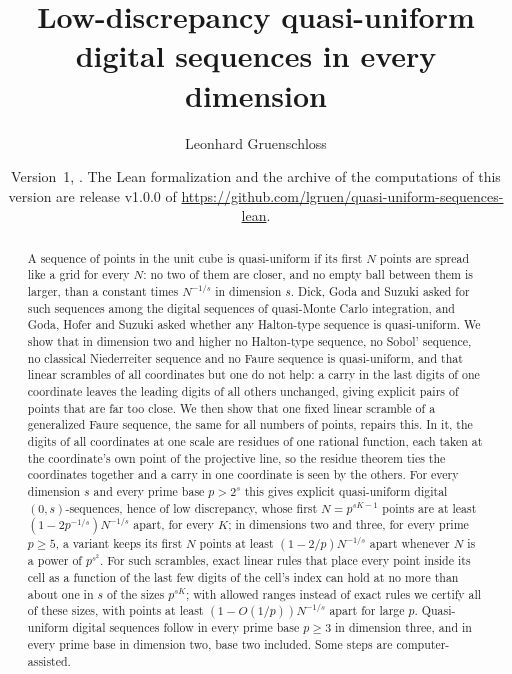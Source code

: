\documentclass[11pt]{amsart}
\title[Quasi-uniform digital sequences in every dimension]{Low-discrepancy quasi-uniform digital sequences in every dimension}
\author{Leonhard Gruenschloss}
\date{Version~1, \VersionDate. The Lean formalization and the archive of the computations of this version are release v1.0.0 of \url{https://github.com/lgruen/quasi-uniform-sequences-lean}.}
\theoremstyle{definition}
\theoremstyle{plain}
\begin{document}
\begin{abstract}
A sequence of points in the unit cube is quasi-uniform if its first $N$ points are spread like a grid for every $N$: no two of them are closer, and no empty ball between them is larger, than a constant times $N^{-1/s}$ in dimension $s$. Dick, Goda and Suzuki asked for such sequences among the digital sequences of quasi-Monte Carlo integration, and Goda, Hofer and Suzuki asked whether any Halton-type sequence is quasi-uniform. We show that in dimension two and higher no Halton-type sequence, no Sobol' sequence, no classical Niederreiter sequence and no Faure sequence is quasi-uniform, and that linear scrambles of all coordinates but one do not help: a carry in the last digits of one coordinate leaves the leading digits of all others unchanged, giving explicit pairs of points that are far too close. We then show that one fixed linear scramble of a generalized Faure sequence, the same for all numbers of points, repairs this. In it, the digits of all coordinates at one scale are residues of one rational function, each taken at the coordinate's own point of the projective line, so the residue theorem ties the coordinates together and a carry in one coordinate is seen by the others. For every dimension $s$ and every prime base $p>2^s$ this gives explicit quasi-uniform digital $(0,s)$-sequences, hence of low discrepancy, whose first $N=p^{sK-1}$ points are at least $(1-2p^{-1/s})N^{-1/s}$ apart, for every $K$; in dimensions two and three, for every prime $p\ge5$, a variant keeps its first $N$ points at least $(1-2/p)N^{-1/s}$ apart whenever $N$ is a power of $p^{s^2}$. For such scrambles, exact linear rules that place every point inside its cell as a function of the last few digits of the cell's index can hold at no more than about one in $s$ of the sizes $p^{sK}$; with allowed ranges instead of exact rules we certify all of these sizes, with points at least $(1-O(1/p))N^{-1/s}$ apart for large $p$. Quasi-uniform digital sequences follow in every prime base $p\ge3$ in dimension three, and in every prime base in dimension two, base two included. Some steps are computer-assisted.
\end{abstract}

\maketitle









%



\end{document}
